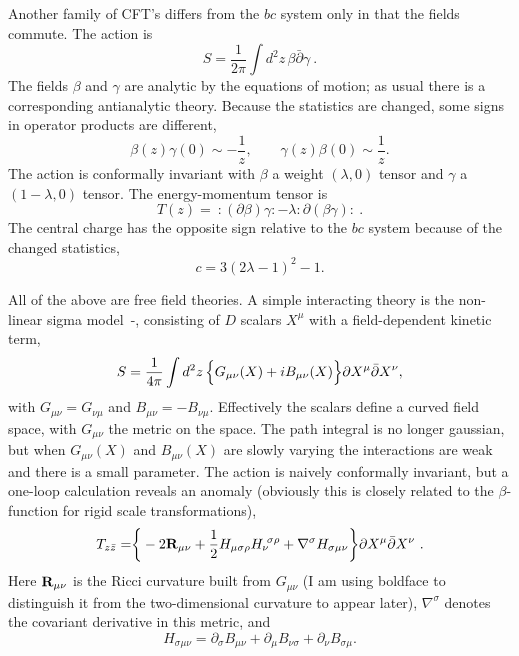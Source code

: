 Another family of CFT's differs from the $bc$ system
only in that the fields commute.
The action is
\begin{equation}
S = \frac{1}{2\pi} \int d^2z \,\beta \bar\partial \gamma \ .
\end{equation}
The fields $\beta$ and $\gamma$ are analytic by the equations of
motion; as usual there is a corresponding antianalytic theory. 
Because the statistics are changed, some signs in operator products
are different,
\begin{equation}
\beta(z)\gamma(0) \sim -\frac{1}{z}, \qquad
\gamma(z)\beta(0) \sim \frac{1}{z}.
\end{equation}
The action is conformally invariant with $\beta$ a weight $(\lambda,
0)$ tensor and
$\gamma$ a $(1-\lambda, 0)$ tensor.  The energy-momentum tensor is
\begin{equation}
T(z) =\ :\! (\partial \beta) \gamma \! :
- \lambda :\! \partial( \beta \gamma ) \! :\ .
\end{equation}
The central charge has the opposite sign relative to the $bc$
system because of the changed statistics,
\begin{equation}
c =  3(2 \lambda - 1)^2 - 1.
\end{equation}

All of the above are free field theories.  A simple interacting
theory is the non-linear sigma model~\cite{Fnlsm}-\cite{CFMP},
consisting of $D$ scalars $X^\mu$ with a field-dependent
kinetic term,
\begin{equation}
S= \frac{1}{4\pi} \int d^2z\,\Bigr\{ G_{\mu\nu}(X) + i B_{\mu\nu}(X)
\Bigl\}
\partial X^\mu \bar\partial X^\nu, \label{nlsm}
\end{equation}
with $G_{\mu\nu}= G_{\nu\mu}$ and $B_{\mu\nu} = - B_{\nu\mu}$.
Effectively the scalars define a curved field space, with
$G_{\mu\nu}$ the metric on the space.
The path integral is no longer gaussian, but
when $G_{\mu\nu}(X)$ and $B_{\mu\nu}(X)$ are slowly varying
the interactions are weak and there is a small parameter.
The action is naively conformally invariant, but a one-loop
calculation reveals an anomaly (obviously this is closely related
to the $\beta$-function for rigid scale transformations),
\begin{equation}
T_{z\bar z} = \biggr\{- 2 {\bf R}_{\mu\nu} + \frac{1}{2}
H_{\mu\sigma\rho}H_\nu\!^{\sigma\rho} + \nabla^\sigma
H_{\sigma\mu\nu} \biggr\}
\partial X^\mu \bar\partial X^\nu \ . \label{tzzb}
\end{equation}
Here ${\bf R}_{\mu\nu}$ is the Ricci curvature built from
$G_{\mu\nu}$ (I am using boldface to distinguish it from the
two-dimensional curvature to appear later),
$\nabla^\sigma$ denotes the covariant derivative in this metric, and
\begin{equation}
H_{\sigma\mu\nu} =
\partial_\sigma B_{\mu\nu} +
\partial_\mu B_{\nu\sigma} + \partial_\nu B_{\sigma\mu}.
\label{hsmn}
\end{equation}

